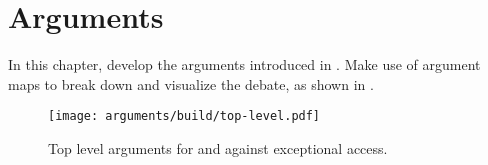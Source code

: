 \chapter{Arguments}
\label{chap-arguments}

In this chapter, develop the arguments introduced in . Make use of argument maps to break down
and visualize the debate, as shown in .

% 
\begin{figure}[h]
    \centering\CaptionFontSize
    \texttt{[image: arguments/build/top-level.pdf]}
    \caption[Argument: Top Level]{Top level arguments for and against exceptional access.}
    \label{fig-args-top-level}
\end{figure}
